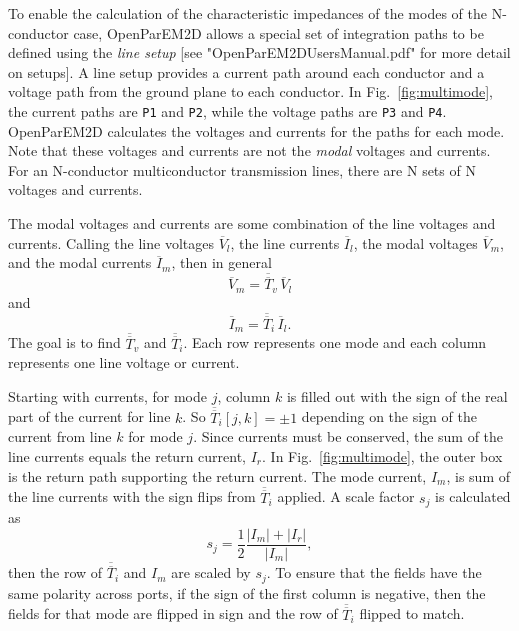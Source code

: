 \documentclass[titlepage]{article}
\renewcommand\_{\textunderscore\linebreak[1]}
\begin{document}
To enable the calculation of the characteristic impedances of the modes of the N-conductor case, OpenParEM2D allows a special set of integration paths to be defined using the \textit{line setup} [see "OpenParEM2D\_Users\_Manual.pdf" for more detail on setups].  A line setup provides a current path around each conductor and a voltage path from the ground plane to each conductor.  In Fig.~\ref{fig:multimode}, the current paths are \texttt{\_P1} and \texttt{\_P2}, while the voltage paths are \texttt{\_P3} and \texttt{\_P4}.  OpenParEM2D calculates the voltages and currents for the paths for each mode.  Note that these voltages and currents are not the \textit{modal} voltages and currents.  For an N-conductor multiconductor transmission lines, there are N sets of N voltages and currents.

The modal voltages and currents are some combination of the line voltages and currents.  Calling the line voltages $\overline{V}_l$, the line currents $\overline{I}_l$, the modal voltages $\overline{V}_m$, and the modal currents $\overline{I}_m$, then in general
\begin{equation}
\overline{V}_m=\overline{\overline{T}}_v\,\overline{V}_l
\end{equation}
and
\begin{equation}
\overline{I}_m=\overline{\overline{T}}_i\,\overline{I}_l.
\end{equation}
The goal is to find $\overline{\overline{T}}_v$ and $\overline{\overline{T}}_i$.  Each row represents one mode and each column represents one line voltage or current.

Starting with currents, for mode $j$, column $k$ is filled out with the sign of the real part of the current for line $k$.  So $\overline{\overline{T}}_i[j,k]=\pm 1$ depending on the sign of the current from line $k$ for mode $j$.  Since currents must be conserved, the sum of the line currents equals the return current, $I_r$.
In Fig.~\ref{fig:multimode}, the outer box is the return path supporting the return current.  The mode current, $I_m$, is sum of the line currents with the sign flips from $\overline{\overline{T}}_i$ applied.  A scale factor $s_j$ is calculated as 
\begin{equation}
s_j=\frac{1}{2}\frac{|I_m|+|I_r|}{|I_m|},
\end{equation}
then the row of $\overline{\overline{T}}_i$ and $I_m$ are scaled by $s_j$.
To ensure that the fields have the same polarity across ports, if the sign of the first column is negative, then the fields for that mode are flipped in sign and the row of $\overline{\overline{T}}_i$ flipped to match.
\end{document}
